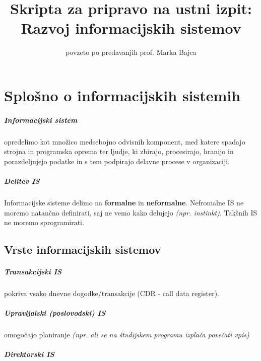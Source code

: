 \documentclass[a4paper,12pt]{report}
\begin{document}
\title{Skripta za pripravo na ustni izpit:\\Razvoj informacijskih sistemov}
\author{povzeto po predavanjih prof. Marka Bajca}

\maketitle

\chapter{Splošno o informacijskih sistemih}

\paragraph{Informacijski sistem} opredelimo kot množico medsebojno odvisnih komponent,
   med katere spadajo strojna in programska oprema ter ljudje, ki zbirajo, procesirajo,
   hranijo in porazdeljujejo podatke in s tem podpirajo delavne procese v organizaciji.
      

\paragraph{Delitev IS} Informacijske sisteme delimo na \textbf{formalne} in \textbf{neformalne}. 
Nefromalne IS ne moremo natančno definirati, saj ne vemo kako delujejo \textit{(npr. instinkt)}. Takšnih IS ne moremo sprogramirati.

\section{Vrste informacijskih sistemov}

   \paragraph{Transakcijski IS} pokriva vsako dnevne dogodke/transakcije (CDR - call data register).

   \paragraph{Upravljalski (poslovodski) IS} omogočajo planiranje \textit{(npr. ali se na študijskem programu izplača povečati vpis)}

   \paragraph{Direktorski IS}\mbox{}
\end{document}
